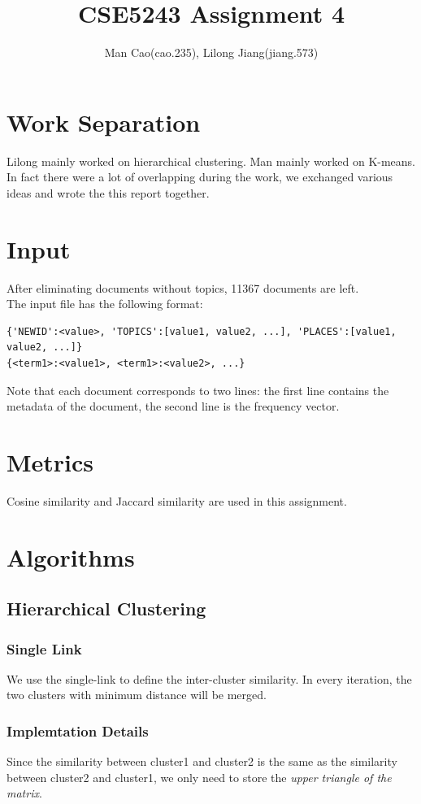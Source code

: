 \documentclass{article}
\begin{document}
\title{CSE5243 Assignment 4}
\author{Man Cao(cao.235), Lilong Jiang(jiang.573)}
\maketitle

\section{Work Separation}
Lilong mainly worked on hierarchical clustering. Man mainly worked on
K-means. In fact there were a lot of overlapping during the
work, we exchanged various ideas and wrote the this report together.
\section{Input}
After eliminating documents without topics, 11367 documents are left.\\
The input file has the following format:
\begin{verbatim}
{'NEWID':<value>, 'TOPICS':[value1, value2, ...], 'PLACES':[value1, value2, ...]}
{<term1>:<value1>, <term1>:<value2>, ...}
\end{verbatim}
Note that each document corresponds to two lines: the first line contains the
metadata of the document, the second line is the frequency vector.

\section{Metrics}
Cosine similarity and Jaccard similarity are used in this assignment.

\section{Algorithms}
\subsection{Hierarchical Clustering}
\subsubsection{Single Link}
We use the single-link to define the inter-cluster similarity. In every
iteration, the two clusters with minimum distance will be merged.
\subsubsection{Implemtation Details}
Since the similarity between cluster1 and cluster2 is the same as the similarity
between cluster2 and cluster1, we only need to store the \emph{upper triangle of
the matrix}.
\end{document}
